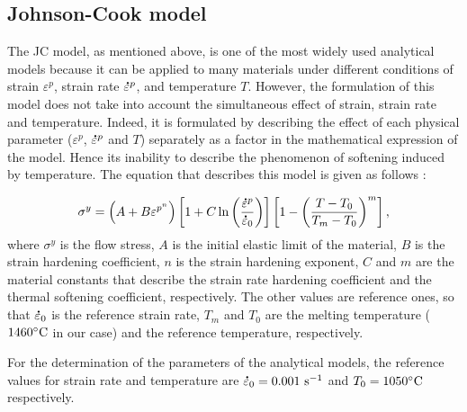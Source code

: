 \documentclass[twoside,english,1p,final,sort&compress]{elsarticle}
\theoremstyle{plain}
\newcommand{\mdot}[1]{\accentset{\mbox{\bfseries .}}{#1}}
\begin{document}
\subsection{Johnson-Cook model\label{sec:JC}}

The JC model, as mentioned above, is one of the most widely used analytical models because it can be applied to many materials under different conditions of strain $\varepsilon^p$, strain rate $\mdot\varepsilon^p$, and temperature $T$.
However, the formulation of this model does not take into account the simultaneous effect of strain, strain rate and temperature.
Indeed, it is formulated by describing the effect of each physical parameter ($\varepsilon^p$, $\mdot\varepsilon^p$ and $T$) separately as a factor in the mathematical expression of the model.
Hence its inability to describe the phenomenon of softening induced by temperature.
The equation that describes this model is given as follows \cite{Johnson-1983}:

\begin{equation}
\sigma^y=\left(A+B\varepsilon^{p^{n}}\right) \left[1+C\ln\left(\frac{\mdot\varepsilon^p}{\mdot\varepsilon_0}\right)\right] \left[1-\left(\frac{T-T_0}{T_m-T_0}\right)^{m}\right],\label{eq:Johnson-Cook}
\end{equation}
where $\sigma^y$ is the flow stress, $A$ is the initial elastic limit of the material, $B$ is the strain hardening coefficient, $n$ is the strain hardening exponent, $C$ and $m$ are the material constants that describe the strain rate hardening coefficient and the thermal softening coefficient, respectively.
The other values are reference ones, so that $\mdot\varepsilon_0$ is the reference strain rate, $T_m$ and $T_0$ are the melting temperature ($1460\celsius$ in our case) and the reference temperature, respectively.

For the determination of the parameters of the analytical models, the reference values for strain rate and temperature are $\mdot\varepsilon_0=0.001~\text{s}^{-1}$ and $T_0=1050\celsius$ respectively.
\end{document}
